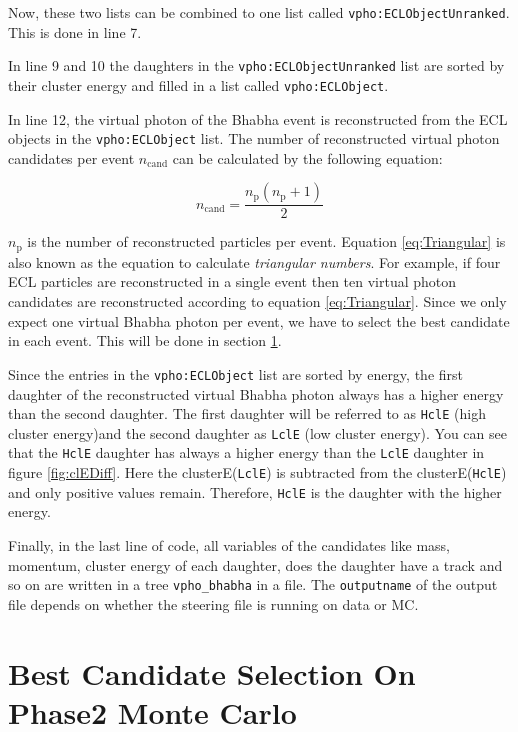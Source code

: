 \documentclass[a4paper,11pt,twosided,final,german,openbib,pdftex,listof=totoc,bibliography=totoc]{scrbook}
\begin{document}
Now, these two lists can be combined to one list called \texttt{vpho:ECLObjectUnranked}. This is done in line 7.

In line 9 and 10 the daughters in the \texttt{vpho:ECLObjectUnranked} list are sorted by their cluster energy and filled in a list called \texttt{vpho:ECLObject}.

In line 12, the virtual photon of the Bhabha event is reconstructed from the ECL objects in the \texttt{vpho:ECLObject} list. The number of reconstructed virtual photon candidates per event $n_{\textrm{cand}}$ can be calculated by the following equation\cite{triangular}:

\begin{equation}
n_{\textrm{cand}} = \frac{n_{\textrm{p}}(n_{\textrm{p}} +1)}{2}
\label{eq:Triangular}
\end{equation}

$n_{\textrm{p}}$ is the number of reconstructed particles per event. Equation \ref{eq:Triangular} is also known as the equation to calculate \textit{triangular numbers}. For example, if four ECL particles are reconstructed in a single event then ten virtual photon candidates are reconstructed according to equation \ref{eq:Triangular}. Since we only expect one virtual Bhabha photon per event, we have to select the best candidate in each event. This will be done in section \ref{sec:SelectingBhabhaMC}.

Since the entries in the \texttt{vpho:ECLObject} list are sorted by energy, the first daughter of the reconstructed virtual Bhabha photon always has a higher energy than the second daughter. The first daughter will be referred to as \texttt{HclE} (high cluster energy)and the second daughter as \texttt{LclE} (low cluster energy). You can see that the \texttt{HclE} daughter has always a higher energy than the \texttt{LclE} daughter in figure \ref{fig:clEDiff}. Here the clusterE(\texttt{LclE}) is subtracted from the clusterE(\texttt{HclE}) and only positive values remain. Therefore, \texttt{HclE} is the daughter with the higher energy.

Finally, in the last line of code, all variables of the candidates like mass, momentum, cluster energy of each daughter, does the daughter have a track and so on are written in a tree \texttt{vpho\_bhabha} in a file. The \texttt{outputname} of the output file depends on whether the steering file is running on data or MC. 


\section{Best Candidate Selection On Phase2 Monte Carlo}
\label{sec:SelectingBhabhaMC}
\end{document}
